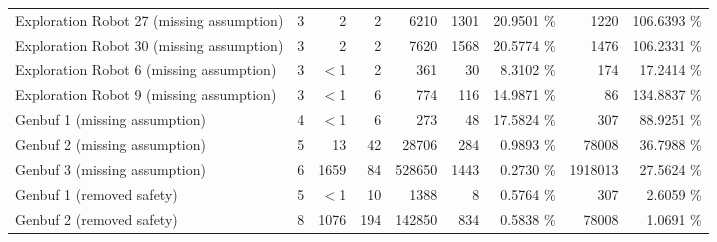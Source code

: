 \begin{tabular}{|l|rr|rr|rr|rr|}
  Exploration Robot 27 (missing assumption) &    3 & 2 & 2 & 6210 & 1301 & 20.9501 \% & 1220 & 106.6393 \% \\ 
  Exploration Robot 30 (missing assumption) &    3 & 2 & 2 & 7620 & 1568 & 20.5774 \% & 1476 & 106.2331 \% \\ 
  Exploration Robot 6 (missing assumption) &    3 & $<$1 & 2 & 361 & 30 &  8.3102 \% & 174 &  17.2414 \% \\ 
  Exploration Robot 9 (missing assumption) &    3 & $<$1 & 6 & 774 & 116 & 14.9871 \% & 86 & 134.8837 \% \\ 
  Genbuf 1 (missing assumption) &    4 & $<$1 & 6 & 273 & 48 & 17.5824 \% & 307 &  88.9251 \% \\ 
  Genbuf 2 (missing assumption) &    5 & 13 & 42 & 28706 & 284 &  0.9893 \% & 78008 &  36.7988 \% \\ 
  Genbuf 3 (missing assumption) &    6 & 1659 & 84 & 528650 & 1443 &  0.2730 \% & 1918013 &  27.5624 \% \\ 
  Genbuf 1 (removed safety) &    5 & $<$1 & 10 & 1388 & 8 &  0.5764 \% & 307 &   2.6059 \% \\ 
  Genbuf 2 (removed safety) &    8 & 1076 & 194 & 142850 & 834 &  0.5838 \% & 78008 &   1.0691 \% \\ 
   \hline
\end{tabular}
